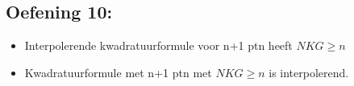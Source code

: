 \documentclass[../Oefenzitting4.tex]{subfiles}
\begin{document}
  \subsection{Oefening 10:}
    \begin{itemize}
      \item Interpolerende kwadratuurformule voor n+1 ptn heeft $NKG \geq n $
      \item Kwadratuurformule met n+1 ptn met $NKG \geq n$ is interpolerend.
    \end{itemize}
\end{document}
